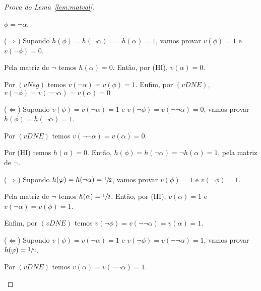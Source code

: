 \begin{proof}[Prova do Lema~\ref{lem:matval}]
        \begin{provaporcasos}
            \casodeprova{} $\phi = \neg \alpha$.
                
                \begin{provaporsubcasos}
                        
                        ($\Longrightarrow$) Supondo $h(\phi) = h(\neg \alpha) = \neg h(\alpha) = 1$, vamos provar $v(\phi) = 1$ e $v(\neg \phi) = 0$. 
                        
                        Pela matriz de $\neg$ temos $h(\alpha) = 0$. Então, por (HI), $v(\alpha) = 0$. 
                        
                        Por $(vNeg)$ temos $v(\neg \alpha) = v(\phi) = 1$. Enfim, por $(vDNE)$, $v(\neg \phi) = v(\neg \neg \alpha) = v(\alpha) = 0$
                        
                        
                        ($\Longleftarrow$) Supondo $v(\phi) = v(\neg \alpha) = 1$ e $v(\neg \phi) = v(\neg \neg \alpha) = 0$, vamos provar $h(\phi) = h(\neg \alpha) = 1$.
                        
                        Por $(vDNE)$ temos $v(\neg \neg \alpha) = v(\alpha) = 0$.
                        
                        Por (HI) temos $h(\alpha) = 0$. Então, $h(\phi) = h(\neg \alpha) = \neg h(\alpha) = 1$, pela matriz de $\neg$.
                    
                    
                        ($\Longrightarrow$) Supondo $h(\varphi) = h(\neg \alpha) = \sfrac{1}{2}{}$, vamos provar $v(\phi) = 1$ e $v(\neg \phi) = 1$.
                        
                        Pela matriz de $\neg$ temos $h(\alpha) = \sfrac{1}{2}{}$. Então, por (HI), $v(\alpha) = 1$ e $v(\neg \alpha) = v(\phi) = 1$.
                        
                        Enfim, por $(vDNE)$ temos $v(\neg \phi) = v(\neg \neg \alpha) = v(\alpha) = 1$.
                        
                        ($\Longleftarrow$) Supondo $v(\phi) = v(\neg \alpha) = 1$ e $v(\neg \phi) = v(\neg \neg \alpha)= 1$, vamos provar $h(\varphi) = \sfrac{1}{2}{}$.

                        Por $(vDNE)$ temos $v(\alpha) = v(\neg \neg \alpha) = 1$.
                        

\end{provaporsubcasos}
\end{provaporcasos}
\end{proof}
